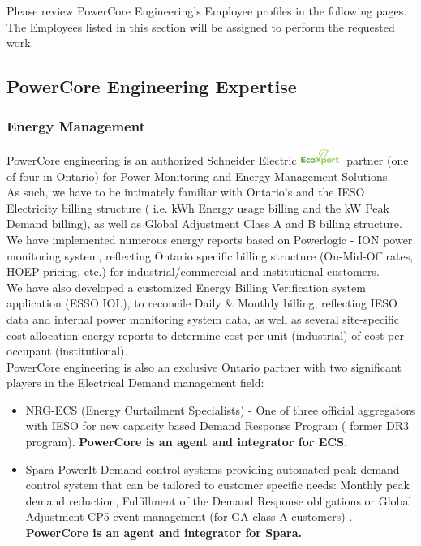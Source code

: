 Please review PowerCore Engineering's Employee profiles in the following pages.  The Employees listed in this section will be assigned to perform the requested work.    



\subsection{PowerCore Engineering Expertise}
\label{ETQ:PCEExp}

\subsubsection{Energy Management}
\label{ETQ:PCEExp:EM}

PowerCore engineering is an authorized Schneider Electric \includegraphics[height=0.2in]{../Images/ecoxpert-logo.png} partner (one of four in Ontario) for Power Monitoring and Energy Management Solutions.\\

As such, we have to be intimately familiar with Ontario’s and the IESO Electricity billing structure ( i.e. kWh Energy usage billing and the kW Peak Demand billing), as well as Global Adjustment Class A and B billing structure.\\
 
We have implemented numerous energy reports based on Powerlogic - ION power monitoring system, reflecting Ontario specific billing structure (On-Mid-Off rates, HOEP pricing, etc.) for industrial/commercial and institutional customers.\\

We have also developed a customized Energy Billing Verification system application (ESSO IOL), to reconcile Daily \& Monthly billing, reflecting IESO data and internal power monitoring system data, as well as several site-specific cost allocation energy reports to determine cost-per-unit (industrial) of cost-per-occupant (institutional).\\

PowerCore engineering is also an exclusive Ontario partner with two significant players in the Electrical Demand management field:
\begin{itemize}
	\item NRG-ECS (Energy Curtailment Specialists) - One of three official aggregators with IESO for new capacity based Demand Response Program ( former DR3 program).  \textbf{PowerCore is an agent and integrator for ECS.}
	\item Spara-PowerIt  Demand control systems providing automated peak demand control system that can be tailored to customer specific needs: Monthly peak demand reduction, Fulfillment of the Demand Response obligations or Global Adjustment CP5 event management (for GA class A customers) .  \textbf{PowerCore is an agent and integrator for Spara.}
\end{itemize}

